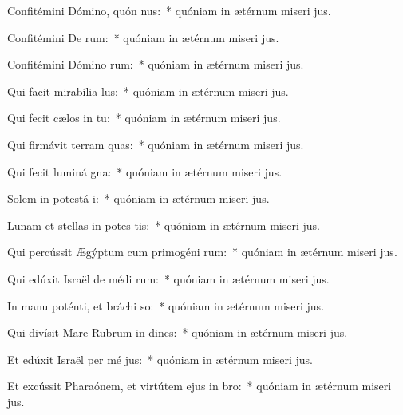 \item Confitémini Dómino, quón nus:~* quóniam in ætérnum miseri jus.
\item Confitémini De rum:~* quóniam in ætérnum miseri jus.
\item Confitémini Dómino rum:~* quóniam in ætérnum miseri jus.
\item Qui facit mirabília  lus:~* quóniam in ætérnum miseri jus.
\item Qui fecit cælos in tu:~* quóniam in ætérnum miseri jus.
\item Qui firmávit terram  quas:~* quóniam in ætérnum miseri jus.
\item Qui fecit luminá gna:~* quóniam in ætérnum miseri jus.
\item Solem in potestá i:~* quóniam in ætérnum miseri jus.
\item Lunam et stellas in potes tis:~* quóniam in ætérnum miseri jus.
\item Qui percússit Ægýptum cum primogéni rum:~* quóniam in ætérnum miseri jus.
\item Qui edúxit Israël de médi rum:~* quóniam in ætérnum miseri jus.
\item In manu poténti, et bráchi so:~* quóniam in ætérnum miseri jus.
\item Qui divísit Mare Rubrum in dines:~* quóniam in ætérnum miseri jus.
\item Et edúxit Israël per mé jus:~* quóniam in ætérnum miseri jus.
\item Et excússit Pharaónem, et virtútem ejus in  bro:~* quóniam in ætérnum miseri jus.
